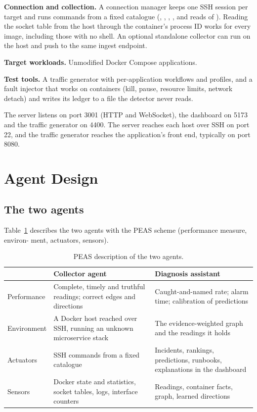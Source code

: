 \textbf{Connection and collection.} A connection manager keeps one SSH session per target and runs commands from a fixed catalogue (, , , , and reads of ). Reading the socket table from the host through the container's process ID works for every image, including those with no shell. An optional standalone collector can run on the host and push to the same ingest endpoint.

\textbf{Target workloads.} Unmodified Docker Compose applications.

\textbf{Test tools.} A traffic generator with per-application workflows and profiles, and a fault injector that works on containers (kill, pause, resource limits, network detach) and writes its ledger to a file the detector never reads.

The server listens on port 3001 (HTTP and WebSocket), the dashboard on 5173 and the traffic generator on 4400. The server reaches each host over SSH on port 22, and the traffic generator reaches the application's front end, typically on port 8080.

\section{Agent Design}

\subsection{The two agents}
Table~\ref{tab:peas} describes the two agents with the PEAS scheme (performance measure, environ- ment, actuators, sensors).

\begin{table}[!htbp]
\centering
\caption{PEAS description of the two agents.}
\label{tab:peas}
\small
\renewcommand{\arraystretch}{1.25}
\begin{tabularx}{\textwidth}{>{\raggedright\arraybackslash}p{2.4cm}>{\raggedright\arraybackslash}X>{\raggedright\arraybackslash}X}
\toprule
 & \textbf{Collector agent} & \textbf{Diagnosis assistant}\\
\midrule
Performance & Complete, timely and truthful readings; correct edges and directions & Caught-and-named rate; alarm time; calibration of predictions\\
Environment & A Docker host reached over SSH, running an unknown microservice stack & The evidence-weighted graph and the readings it holds\\
Actuators & SSH commands from a fixed catalogue & Incidents, rankings, predictions, runbooks, explanations in the dashboard\\
Sensors & Docker state and statistics, socket tables, logs, interface counters & Readings, container facts, graph, learned directions\\
\bottomrule
\end{tabularx}
\end{table}

